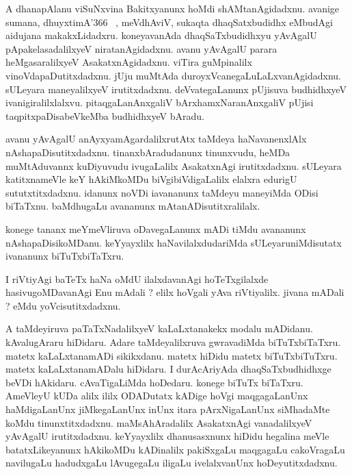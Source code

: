 \documentclass{article}
\begin{document}
\begin{mn}%
A dhanapAlanu viSuNxvina Bakitxyanunx hoMdi shAMtanAgidadxnu. avanige sumana, dhuyxtimA\char'366 ~, 
meVdhAviV, sukaqta dhaqSatxbudidhx eMbudAgi aidujana makakxLidadxru. koneyavanAda 
dhaqSaTxbudidhxyu yAvAgalU pApakelasadalilxyeV niratanAgidadxnu. avanu yAvAgalU parara 
heMgasaralilxyeV AsakatxnAgidadxnu. viTira guMpinalilx vinoVdapaDutitxdadxnu. jUju muMtAda 
duroyxVcanegaLuLaLxvanAgidadxnu. sULeyara maneyalilxyeV irutitxdadxnu. deVvategaLanunx pUjisuva 
budhidhxyeV ivanigiralilxlalxvu. pitaqgaLanAnxgaliV bArxhamxNaranAnxgaliV pUjisi 
taqpitxpaDisabeVkeMba budhidhxyeV bAradu.
\end{mn}

\begin{mn}%
avanu yAvAgalU anAyxyamAgardalilxrutAtx taMdeya haNavanenxlAlx nAshapaDisutitxdadxnu. 
tinanxbAradudanunx tinunxvudu, heMDa muMtAduvannx kuDiyuvudu ivugaLalilx AsakatxnAgi 
irutitxdadxnu. sULeyara katitxnameVle keY hAkiMkoMDu biVgibiVdigaLalilx elalxra edurigU 
sututxtitxdadxnu. idanunx noVDi iavananunx taMdeyu maneyiMda ODisi biTaTxnu. baMdhugaLu avananunx 
mAtanADisutitxralilalx.
\end{mn}

\begin{mn}%
konege tananx meYmeVliruva oDavegaLanunx mADi tiMdu avananunx nAshapaDisikoMDanu. keYyayxlilx 
haNavilalxdudariMda sULeyaruniMdisutatx ivananunx biTuTxbiTaTxru.
\end{mn}

\begin{mn}%
I riVtiyAgi baTeTx haNa oMdU ilalxdavanAgi hoTeTxgilalxde hasivugoMDavanAgi Enu mAdali ? elilx 
hoVgali yAva riVtiyalilx. jivana mADali ? eMdu yoVcisutitxdadxnu.
\end{mn}

\begin{mn}%
A taMdeyiruva paTaTxNadalilxyeV kaLaLxtanakekx modalu mADidanu. kAvalugAraru hiDidaru. Adare 
taMdeyalilxruva gwravadiMda biTuTxbiTaTxru. matetx kaLaLxtanamADi sikikxdanu. matetx hiDidu matetx 
biTuTxbiTuTxru. matetx kaLaLxtanamADalu hiDidaru. I durAcAriyAda dhaqSaTxbudhidhxge beVDi 
hAkidaru. cAvaTigaLiMda hoDedaru. konege biTuTx biTaTxru. AmeVleyU kUDa alilx ililx ODADutatx 
kADige hoVgi maqgagaLanUnx haMdigaLanUnx jiMkegaLanUnx inUnx itara pArxNigaLanUnx siMhadaMte koMdu 
tinunxtitxdadxnu. maMsAhAradalilx AsakatxnAgi vanadalilxyeV yAvAgalU irutitxdadxnu. keYyayxlilx 
dhanusasxnunx hiDidu hegalina meVle batatxLikeyanunx hAkikoMDu kADinalilx pakiSxgaLu maqgagaLu 
cakoVragaLu navilugaLu hadudxgaLu lAvugegaLu iligaLu ivelalxvanUnx hoDeyutitxdadxnu.
\end{mn}
\end{document}
